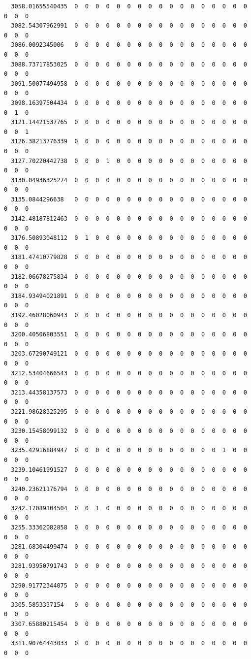\documentclass[
  letterpaper,
  DIV=11,
  numbers=noendperiod]{scrartcl}
\begin{document}
\begin{verbatim}
  3058.01655540435  0  0  0  0  0  0  0  0  0  0  0  0  0  0  0  0  0  0  0  0
  3082.54307962991  0  0  0  0  0  0  0  0  0  0  0  0  0  0  0  0  0  0  0  0
  3086.0092345006   0  0  0  0  0  0  0  0  0  0  0  0  0  0  0  0  0  0  0  0
  3088.73717853025  0  0  0  0  0  0  0  0  0  0  0  0  0  0  0  0  0  0  0  0
  3091.50077494958  0  0  0  0  0  0  0  0  0  0  0  0  0  0  0  0  0  0  0  0
  3098.16397504434  0  0  0  0  0  0  0  0  0  0  0  0  0  0  0  0  0  0  1  0
  3121.14421537765  0  0  0  0  0  0  0  0  0  0  0  0  0  0  0  0  0  0  0  1
  3126.38213776339  0  0  0  0  0  0  0  0  0  0  0  0  0  0  0  0  0  0  0  0
  3127.70220442738  0  0  0  1  0  0  0  0  0  0  0  0  0  0  0  0  0  0  0  0
  3130.04936325274  0  0  0  0  0  0  0  0  0  0  0  0  0  0  0  0  0  0  0  0
  3135.0844296638   0  0  0  0  0  0  0  0  0  0  0  0  0  0  0  0  0  0  0  0
  3142.48187812463  0  0  0  0  0  0  0  0  0  0  0  0  0  0  0  0  0  0  0  0
  3176.50893048112  0  1  0  0  0  0  0  0  0  0  0  0  0  0  0  0  0  0  0  0
  3181.47410779828  0  0  0  0  0  0  0  0  0  0  0  0  0  0  0  0  0  0  0  0
  3182.06678275834  0  0  0  0  0  0  0  0  0  0  0  0  0  0  0  0  0  0  0  0
  3184.93494021891  0  0  0  0  0  0  0  0  0  0  0  0  0  0  0  0  0  0  0  0
  3192.46028060943  0  0  0  0  0  0  0  0  0  0  0  0  0  0  0  0  0  0  0  0
  3200.40506803551  0  0  0  0  0  0  0  0  0  0  0  0  0  0  0  0  0  0  0  0
  3203.67290749121  0  0  0  0  0  0  0  0  0  0  0  0  0  0  0  0  0  0  0  0
  3212.53404666543  0  0  0  0  0  0  0  0  0  0  0  0  0  0  0  0  0  0  0  0
  3213.44358137573  0  0  0  0  0  0  0  0  0  0  0  0  0  0  0  0  0  0  0  0
  3221.98628325295  0  0  0  0  0  0  0  0  0  0  0  0  0  0  0  0  0  0  0  0
  3230.15458099132  0  0  0  0  0  0  0  0  0  0  0  0  0  0  0  0  0  0  0  0
  3235.42916884947  0  0  0  0  0  0  0  0  0  0  0  0  0  0  1  0  0  0  0  0
  3239.10461991527  0  0  0  0  0  0  0  0  0  0  0  0  0  0  0  0  0  0  0  0
  3240.23621176794  0  0  0  0  0  0  0  0  0  0  0  0  0  0  0  0  0  0  0  0
  3242.17089104504  0  0  1  0  0  0  0  0  0  0  0  0  0  0  0  0  0  0  0  0
  3255.33362082858  0  0  0  0  0  0  0  0  0  0  0  0  0  0  0  0  0  0  0  0
  3281.68304499474  0  0  0  0  0  0  0  0  0  0  0  0  0  0  0  0  0  0  0  0
  3281.93950791743  0  0  0  0  0  0  0  0  0  0  0  0  0  0  0  0  0  0  0  0
  3290.91772344075  0  0  0  0  0  0  0  0  0  0  0  0  0  0  0  0  0  0  0  0
  3305.5853337154   0  0  0  0  0  0  0  0  0  0  0  0  0  0  0  0  0  0  0  0
  3307.65880215454  0  0  0  0  0  0  0  0  0  0  0  0  0  0  0  0  0  0  0  0
  3311.90764443033  0  0  0  0  0  0  0  0  0  0  0  0  0  0  0  0  0  0  0  0
                  

\end{verbatim}
\end{document}
